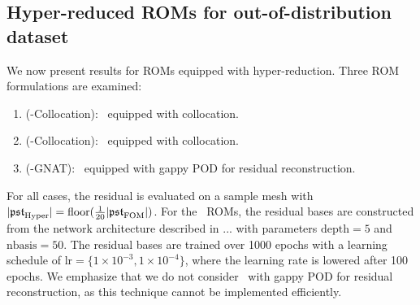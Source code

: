 \documentclass[3p,computermodern,10pt]{elsarticle}
\begin{document}
\subsection{Hyper-reduced ROMs for out-of-distribution dataset}
We now present results for ROMs equipped with hyper-reduction. Three ROM formulations are examined:
\begin{enumerate}
\item (\PSTLSROM-Collocation): \PSTLSROM\ equipped with collocation.  
\item  (\PSTLONEROM-Collocation): \PSTLONEROM\ equipped with collocation.
\item  (\PSTLSROM-GNAT): \PSTLSROM\ equipped with gappy POD for residual reconstruction.
\end{enumerate}
For all cases, the residual is evaluated on a sample mesh with $|\mathfrak{pst}_{\text{Hyper}}| = \text{floor}(\frac{1}{20}|\mathfrak{pst}_{\text{FOM}}|)$. For the \PSTLSROMGNAT\ ROMs, the residual bases are constructed from the network architecture described in ... with parameters $\text{depth} = 5$ and $\text{nbasis} = 50$. The residual bases are trained over 1000 epochs with a learning schedule of $\text{lr} = \{1 \times 10^{-3}, 1 \times 10^{-4} \}$, where the learning rate is lowered after 100 epochs.  
We emphasize that we do not consider \PSTLONEROM\ with gappy POD for residual reconstruction, as this technique cannot be implemented efficiently. 
\end{document}
